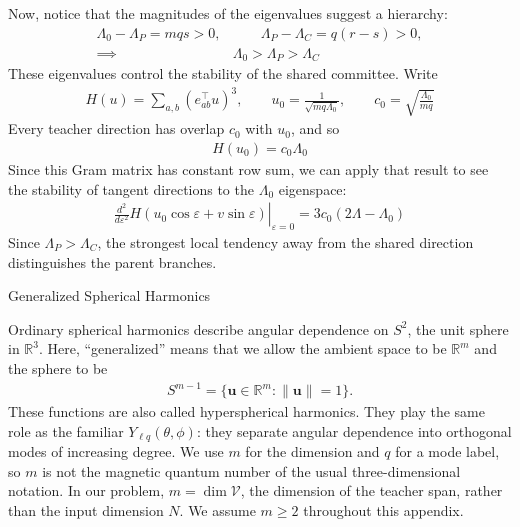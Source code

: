 \documentclass[11pt, reqno]{amsart}
\makeatletter
\def\section{\@startsection{section}{1}%
  \z@{.7\linespacing\@plus\linespacing}{.5\linespacing}%
  {\normalfont\scshape\centering}}
\theoremstyle{notestyle}
\theoremstyle{defstyle}
\newcommand{\R}{\mathbb{R}}
\makeatother
\begin{document}
Now, notice that the magnitudes of the eigenvalues suggest a hierarchy:
\begin{align*}
    \Lambda_0 - \Lambda_P = mqs > 0,&
    \qquad
    \Lambda_P - \Lambda_C = q(r-s) > 0, \\
    \implies
    &\boxed{\Lambda_0 > \Lambda_P > \Lambda_C}
\end{align*}
These eigenvalues control the stability of the shared committee.
Write
\begin{align*}
    H(u) = \sum_{a,b} (e_{ab}^\top u)^3,
    \qquad u_0 = \frac{1}{\sqrt{mq\Lambda_0}},
    \qquad c_0 = \sqrt{\frac{\Lambda_0}{mq}}
\end{align*}
Every teacher direction has overlap $c_0$ with $u_0$, and so
\begin{align*}
    H(u_0) = c_0 \Lambda_0
\end{align*}
Since this Gram matrix has constant row sum, we can apply that result to see the stability of tangent directions to the $\Lambda_0$ eigenspace:
\begin{align*}
    \left. \frac{d^2}{d\varepsilon^2} H(u_0 \cos\varepsilon + v\sin\varepsilon) \right|_{\varepsilon=0}
    = 3c_0(2\Lambda - \Lambda_0)
\end{align*}
Since $\Lambda_P > \Lambda_C$, the strongest local tendency away from the shared direction distinguishes the parent branches.


\appendix
\section{Generalized Spherical Harmonics}
\label{app:generalized-spherical-harmonics}

Ordinary spherical harmonics describe angular dependence on $S^2$, the unit sphere in $\R^3$.
Here, ``generalized'' means that we allow the ambient space to be $\R^m$ and the sphere to be
\begin{align*}
    S^{m-1}=\{\mathbf u\in\R^m:\|\mathbf u\|=1\}.
\end{align*}
These functions are also called hyperspherical harmonics.
They play the same role as the familiar $Y_{\ell q}(\theta,\phi)$: they separate angular dependence into orthogonal modes of increasing degree.
We use $m$ for the dimension and $q$ for a mode label, so $m$ is not the magnetic quantum number of the usual three-dimensional notation.
In our problem, $m=\dim\mathcal V$, the dimension of the teacher span, rather than the input dimension $N$.
We assume $m\geq2$ throughout this appendix.
\end{document}
